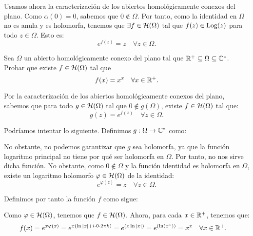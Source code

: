 \begin{ejercicio}
    Usamos ahora la caracterización de los abiertos homológicamente conexos del plano. Como $\alpha(0)=0$, sabemos que $0\notin \Omega$. Por tanto, como la identidad en $\Omega$ no es anula y es holomorfa, tenemos que $\exists f \in \mathcal{H}(\Omega)$ tal que $f(z) \in \operatorname{Log}(z)$ para todo $z \in \Omega$. Esto es:
    \begin{equation*}
        e^{f(z)} = z \quad \forall z \in \Omega.
    \end{equation*}
\end{ejercicio}

\begin{ejercicio}
    Sea $\Omega$ un abierto homológicamente conexo del plano tal que $\mathbb{R}^+ \subseteq \Omega \subseteq \mathbb{C}^*$. Probar que existe $f \in \mathcal{H}(\Omega)$ tal que
    \begin{equation*}
        f(x) = x^x \quad \forall x \in \mathbb{R}^+.
    \end{equation*}

    Por la caracterización de los abiertos homológicamente conexos del plano, sabemos que para todo $g\in \mathcal{H}(\Omega)$ tal que $0\notin g(\Omega)$, existe $f \in \mathcal{H}(\Omega)$ tal que:
    \begin{equation*}
        g(z) = e^{f(z)} \quad \forall z \in \Omega.
    \end{equation*}

    Podríamos intentar lo siguiente. Definimos $g : \Omega \to \mathbb{C}^*$ como:

    No obstante, no podemos garantizar que $g$ sea holomorfa, ya que la función logaritmo principal no tiene por qué ser holomorfa en $\Omega$. Por tanto, no nos sirve dicha función. No obstante, como $0\notin \Omega$ y la función identidad es holomorfa en $\Omega$, existe un logaritmo holomorfo $\varphi\in \mathcal{H}(\Omega)$ de la identidad:
    \begin{equation*}
        e^{\varphi(z)} = z \quad \forall z \in \Omega.
    \end{equation*}

    Definimos por tanto la función $f$ como sigue:

    Como $\varphi\in \mathcal{H}(\Omega)$, tenemos que $f\in \mathcal{H}(\Omega)$. Ahora, para cada $x \in \mathbb{R}^+$, tenemos que:
    \begin{align*}
        f(x) &= e^{x\varphi(x)} = e^{x\left(\ln|x| + i\cdot 0\cdot 2\pi k\right)}
        = e^{\left(x\ln|x|\right)} = e^{\left(\ln(x^x)\right)} = x^x
        \quad \forall x \in \mathbb{R}^+.
    \end{align*}


\end{ejercicio}
